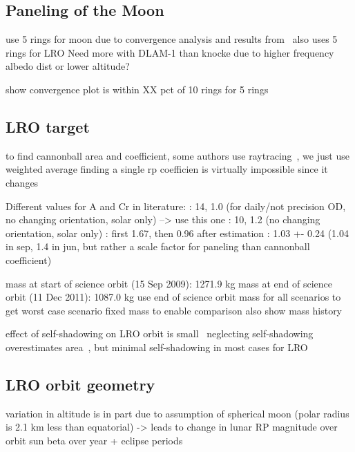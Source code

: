 \subsection{Paneling of the Moon}

use 5 rings for moon due to convergence analysis and results from~\cite{Floberghagen1999}
\cite{Nicholson2010} also uses 5 rings for LRO
Need more with DLAM-1 than knocke due to higher frequency albedo dist or lower altitude?

show convergence plot
is within XX pct of 10 rings for 5 rings




\subsection{LRO target}

to find cannonball area and coefficient, some authors use raytracing~\cite{Hattori2019}, we just use weighted average
finding a single rp coefficien is virtually impossible since it changes~\cite[p~580]{Vallado2013}

Different values for A and Cr in literature:
\cite{Nicholson2010}: 14, 1.0 (for daily/not precision OD, no changing orientation, solar only) --> use this one
\cite{Bauer2016}: 10, 1.2 (no changing orientation, solar only)
\cite{Slojkowski2015}: first 1.67, then 0.96 after estimation
\cite{Mazarico2018}: 1.03 +- 0.24 (1.04 in sep, 1.4 in jun, but rather a scale factor for paneling than cannonball coefficient)

mass at start of science orbit (15 Sep 2009): 1271.9 kg
mass at end of science orbit (11 Dec 2011): 1087.0 kg
use end of science orbit mass for all scenarios to get worst case scenario
fixed mass to enable comparison
also show mass history

effect of self-shadowing on LRO orbit is small~\cite{Loecher2018}
neglecting self-shadowing overestimates area~\cite{Mazarico2009}, but minimal self-shadowing in most cases for LRO~\cite{Slojkowski2015}





\subsection{LRO orbit geometry}

variation in altitude is in part due to assumption of spherical moon (polar radius is 2.1 km less than equatorial) -> leads to change in lunar RP magnitude over orbit
sun beta over year + eclipse periods

